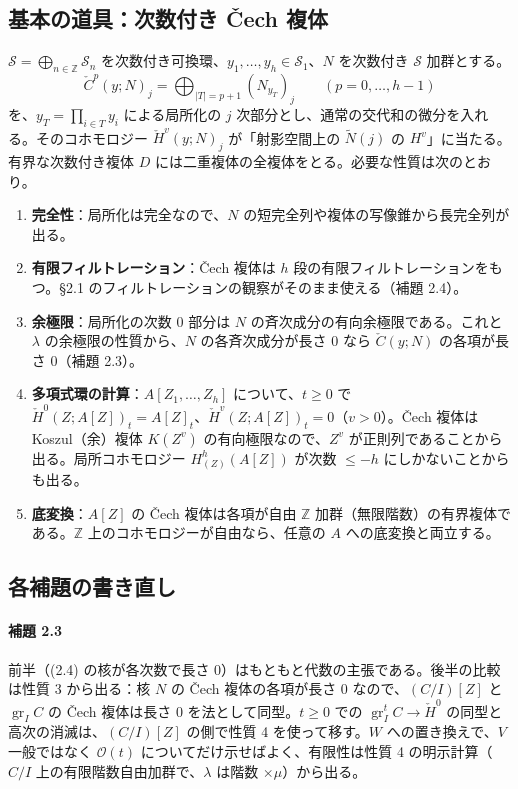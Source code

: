 \documentclass[11pt,a4paper]{ltjsarticle}
\theoremstyle{plain}
\theoremstyle{definition}
\newcommand{\gr}{\operatorname{gr}}
\newcommand{\Z}{\mathbb{Z}}
\newcommand{\cO}{\mathcal{O}}
\begin{document}
\subsection{基本の道具：次数付き Čech 複体}
$\mathcal{S} = \bigoplus_{n\in\Z}\mathcal{S}_n$ を次数付き可換環、$y_1,\dots,y_h\in\mathcal{S}_1$、$N$ を次数付き $\mathcal{S}$ 加群とする。
\[
  \check C^p(y;N)_j = \bigoplus_{|T| = p+1}(N_{y_T})_j\qquad(p = 0,\dots,h-1)
\]
を、$y_T = \prod_{i\in T}y_i$ による局所化の $j$ 次部分とし、通常の交代和の微分を入れる。そのコホモロジー $\check H^v(y;N)_j$ が「射影空間上の $\tilde N(j)$ の $H^v$」に当たる。有界な次数付き複体 $D$ には二重複体の全複体をとる。必要な性質は次のとおり。
\begin{enumerate}
  \item \textbf{完全性}：局所化は完全なので、$N$ の短完全列や複体の写像錐から長完全列が出る。
  \item \textbf{有限フィルトレーション}：Čech 複体は $h$ 段の有限フィルトレーションをもつ。\S2.1 のフィルトレーションの観察がそのまま使える（補題 2.4）。
  \item \textbf{余極限}：局所化の次数 $0$ 部分は $N$ の斉次成分の有向余極限である。これと $\lambda$ の余極限の性質から、$N$ の各斉次成分が長さ $0$ なら $\check C(y;N)$ の各項が長さ $0$（補題 2.3）。
  \item \textbf{多項式環の計算}：$A[Z_1,\dots,Z_h]$ について、$t\ge0$ で $\check H^0(Z;A[Z])_t = A[Z]_t$、$\check H^v(Z;A[Z])_t = 0$（$v>0$）。Čech 複体は Koszul（余）複体 $K(Z^v)$ の有向極限なので、$Z^v$ が正則列であることから出る。局所コホモロジー $H^h_{(Z)}(A[Z])$ が次数 $\le-h$ にしかないことからも出る。
  \item \textbf{底変換}：$A[Z]$ の Čech 複体は各項が自由 $\Z$ 加群（無限階数）の有界複体である。$\Z$ 上のコホモロジーが自由なら、任意の $A$ への底変換と両立する。
\end{enumerate}

\subsection{各補題の書き直し}
\paragraph{補題 2.3}
前半（(2.4) の核が各次数で長さ $0$）はもともと代数の主張である。後半の比較は性質 3 から出る：核 $N$ の Čech 複体の各項が長さ $0$ なので、$(C/I)[Z]$ と $\gr_IC$ の Čech 複体は長さ $0$ を法として同型。$t\ge0$ での $\gr^t_IC\to\check H^0$ の同型と高次の消滅は、$(C/I)[Z]$ の側で性質 4 を使って移す。$W$ への置き換えで、$V$ 一般ではなく $\cO(t)$ についてだけ示せばよく、有限性は性質 4 の明示計算（$C/I$ 上の有限階数自由加群で、$\lambda$ は階数 $\times\mu$）から出る。
\end{document}
